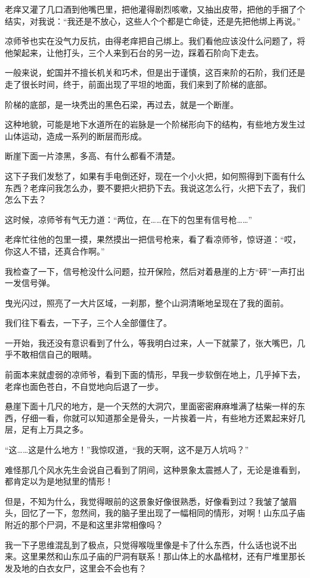 老痒又灌了几口酒到他嘴巴里，把他灌得剧烈咳嗽，又抽出皮带，把他的手捆了个结实，对我说：“我还是不放心，这些人个个都是亡命徒，还是先把他绑上再说。”

凉师爷也实在没气力反抗，由得老痒把自己绑上。我们看他应该没什么问题了，将他架起来，让他打头，三个人来到石台的另一边，踩着石阶向下走去。

一般来说，蛇国并不擅长机关和巧术，但是出于谨慎，这百来阶的石阶，我们还是走了很长时间，终于，前面出现了平坦的地面，我们来到了阶梯的底部。

阶梯的底部，是一块秃出的黑色石梁，再过去，就是一个断崖。

这种地貌，可能是地下水道所在的岩脉是一个阶梯形向下的结构，有些地方发生过山体运动，造成一系列的断层而形成。

断崖下面一片漆黑，多高、有什么都看不清楚。

这下子我们发愁了，如果有手电倒还好，现在一个小火把，如何照得到下面有什么东西？老痒问我怎么办，要不要把火把扔下去。我说这怎么行，火把下去了，我们怎么下去？

这时候，凉师爷有气无力道：“两位，在……在下的包里有信号枪……”

老痒忙往他的包里一摸，果然摸出一把信号枪来，看了看凉师爷，惊讶道：“哎，你这人不错，还真合作啊。”

我检查了一下，信号枪没什么问题，拉开保险，然后对着悬崖的上方“砰”一声打出一发信号弹。

曳光闪过，照亮了一大片区域，一刹那，整个山洞清晰地呈现在了我的面前。

我们往下看去，一下子，三个人全部僵住了。

一开始，我还没有意识看到了什么，等我明白过来，人一下就蒙了，张大嘴巴，几乎不敢相信自己的眼睛。

前面本来就虚弱的凉师爷，看到下面的情形，早我一步软倒在地上，几乎掉下去，老痒也面色苍白，不自觉地向后退了一步。

悬崖下面十几尺的地方，是一个天然的大洞穴，里面密密麻麻堆满了枯柴一样的东西，仔细一看，你就可以知道那全是骨头，一片挨着一片，有些地方还累起来好几层，足有上万具之多。

“这……这是什么地方！”我惊叹道，“我的天啊，这不是万人坑吗？”

难怪那几个风水先生会说自己看到了阴间，这种景象太震撼人了，无论是谁看到，都肯定以为是地狱里的情形！

但是，不知为什么，我觉得眼前的这景象好像很熟悉，好像看到过？我皱了皱眉头，回忆了一下，忽然间，我的脑子里出现了一幅相同的情形，对啊！山东瓜子庙附近的那个尸洞，不是和这里非常相像吗？

我一下子思维混乱到了极点，只觉得喉咙里像是卡了什么东西，什么话也说不出来。这里果然和山东瓜子庙的尸洞有联系！那山体上的水晶棺材，还有尸堆里那长发及地的白衣女尸，这里会不会也有？

